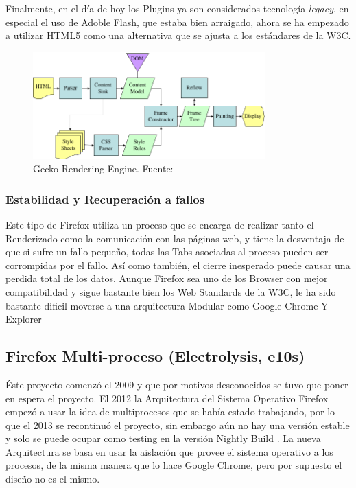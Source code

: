         Finalmente, en el día de hoy los Plugins ya son considerados tecnología \textit{legacy}, en especial el uso de Adoble Flash, que estaba bien arraigado, ahora se ha empezado a utilizar HTML5 como una alternativa que se ajusta a los estándares de la W3C.

        \begin{figure}[h!t]
            \centering
            \includegraphics[width=0.8\textwidth]{figures/Gecko_Overview_9.png}
            \caption{Gecko Rendering Engine. Fuente: \cite{gecko}}
            \label{fig:Gecko}
        \end{figure}

        \subsubsection{Estabilidad y Recuperación a fallos}
        Este tipo de Firefox utiliza un proceso que se encarga de realizar tanto el Renderizado como la comunicación con las páginas web, y tiene la desventaja de que si sufre un fallo pequeño, todas las Tabs asociadas al proceso pueden ser corrompidas por el fallo. Así como también, el cierre inesperado puede causar una perdida total de los datos. Aunque Firefox sea uno de los Browser con mejor compatibilidad y sigue bastante bien los Web Standards de la W3C, le ha sido bastante dificil moverse a una arquitectura Modular como Google Chrome Y Explorer \cite{ElectrolysisTalk}
        
    \subsection{Firefox Multi-proceso (Electrolysis, e10s)} 
    Éste proyecto comenzó el 2009 y que por motivos desconocidos \cite{ElectrolysisTalk} se tuvo que poner en espera el proyecto. El 2012 la Arquitectura del Sistema Operativo Firefox empezó a usar la idea de multiprocesos que se había estado trabajando, por lo que el 2013 se recontinuó el proyecto, sin embargo aún no hay una versión estable y solo se puede ocupar como testing en la versión Nightly Build \cite{NightlyBuilds}. La nueva Arquitectura se basa en usar la aislación que provee el sistema operativo a los procesos, de la misma manera que lo hace Google Chrome, pero por supuesto el diseño no es el mismo.

